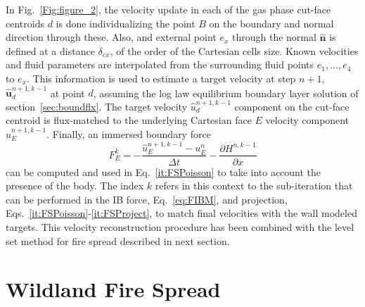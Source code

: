 \documentclass[journal,article,atmosphere,submit,moreauthors,pdftex]{Definitions_Review_Process/mdpi}
\begin{document}
In Fig.~\ref{Fig:figure_2}, the velocity update in each of the gas phase cut-face centroids $d$ is done individualizing the point $B$ on the boundary and normal direction through these. Also, and external point $e_x$ through the normal $\mathbf{\hat{n}}$ is defined at a distance $\delta_{ex}$, of the order of the Cartesian cells size. Known velocities and fluid parameters are interpolated from the surrounding fluid points $e_1,\dots,e_4$ to $e_x$.
This information is used to estimate a target velocity at step $n+1$, $\mathbf{\hat{u}}_d^{n+1,k-1}$ at point $d$, assuming the log law equilibrium boundary layer solution of section~\ref{sec:boundflx}. The target velocity $\hat{u}_d^{n+1,k-1}$ component on the cut-face centroid is flux-matched to the underlying Cartesian face $E$ velocity component $\hat{u}_E^{n+1,k-1}$. Finally, an immersed boundary force
\begin{equation}
F_E^k=-\frac{\hat{u}_E^{n+1,k-1}-u_E^{n}}{\Delta t} - \frac{\partial H^{n,k-1}}{\partial x}
\label{eq:FIBM}
\end{equation}
can be computed and used in Eq.~\eqref{it:FSPoisson} to take into account the presence of the body. The index $k$ refers in this context to the sub-iteration that can be performed in the IB force, Eq.~\eqref{eq:FIBM}, and projection, Eqs.~\eqref{it:FSPoisson}-\eqref{it:FSProject}, to match final velocities with the wall modeled targets. This velocity reconstruction procedure has been combined with the level set method for fire spread described in next section.


\section{Wildland Fire Spread} \label{sec:firespread}
\end{document}
